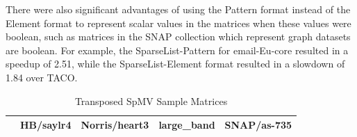 There were also significant advantages of using the Pattern format instead of the Element format to represent scalar values in the matrices when these values were boolean, such as matrices in the SNAP collection which represent graph datasets are boolean. For example, the SparseList-Pattern for email-Eu-core resulted in a speedup of 2.51, while the SparseList-Element format resulted in a slowdown of 1.84 over TACO.

\begin{table}[htbp]
    \centering
    \scriptsize
    \caption{Transposed SpMV Sample Matrices}
    \vspace{-12pt}
    \label{tab:transposed_spmv_sample_matrices}
    \begin{tabular}{|
        >{\centering\arraybackslash}m{}|
        >{\centering\arraybackslash}m{}|
        >{\centering\arraybackslash}m{}|
        >{\centering\arraybackslash}m{}|
        >{\centering\arraybackslash}m{}|}
        \hline
         & \textbf{HB/saylr4} & \textbf{Norris/heart3} & \textbf{large\_band} & \textbf{SNAP/as-735} \\
        \hline

\end{tabular}
\end{table}
